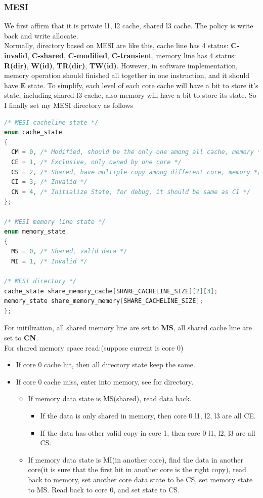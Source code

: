 \mathbb{R} \documentclass{article}
\begin{document}
\subsubsection{MESI}
We first affirm that it is private l1, l2 cache, shared l3 cache. The policy is write back and write allocate.\\
Normally, directory based on MESI are like this, cache line has 4 status: \textbf{C-invalid}, \textbf{C-shared}, \textbf{C-modified}, \textbf{C-transient}, memory line has 4 status: \textbf{R(dir)}, \textbf{W(id)}, \textbf{TR(dir)}, \textbf{TW(id)}. However, in software implementation, memory operation should finished all together in one instruction, and it should have \textbf{E} state. To simplify, each level of each core cache will have a bit to store it's state, including shared l3 cache, also memory will have a bit to store its state. So I finally set my MESI directory as follows
\begin{lstlisting}[language=c++]
/* MESI cacheline state */
enum cache_state
{
  CM = 0, /* Modified, should be the only one among all cache, memory */
  CE = 1, /* Exclusive, only owned by one core */
  CS = 2, /* Shared, have multiple copy among different core, memory */
  CI = 3, /* Invalid */
  CN = 4, /* Initialize State, for debug, it should be same as CI */
};
  
/* MESI memory line state */
enum memory_state
{
  MS = 0, /* Shared, valid data */
  MI = 1, /* Invalid */

/* MESI directory */
cache_state share_memory_cache[SHARE_CACHELINE_SIZE][2][3];
memory_state share_memory_memory[SHARE_CACHELINE_SIZE];
};
\end{lstlisting}
For initilization, all shared memory line are set to \textbf{MS}, all shared cache line are set to \textbf{CN}. \\
For shared memory space read:(suppose current is core 0)
\begin{itemize}
  \item If core 0 cache hit, then all directory state keep the same.
  \item If core 0 cache miss, enter into memory, see for directory.
    \begin{itemize}
      \item If memory data state is MS(shared), read data back.
        \begin{itemize}
          \item If the data is only shared in memory, then core 0 l1, l2, l3 are all CE.
          \item If the data has other valid copy in core 1, then core 0 l1, l2, l3 are all CS.
        \end{itemize}
      \item If memory data state is MI(in another core), find the data in another core(it is sure that the first hit in another core is the right copy), read back to memory, set another core data state to be CS, set memory state to MS. Read back to core 0, and set state to CS. 
    \end{itemize}
\end{itemize} 
\end{document}
